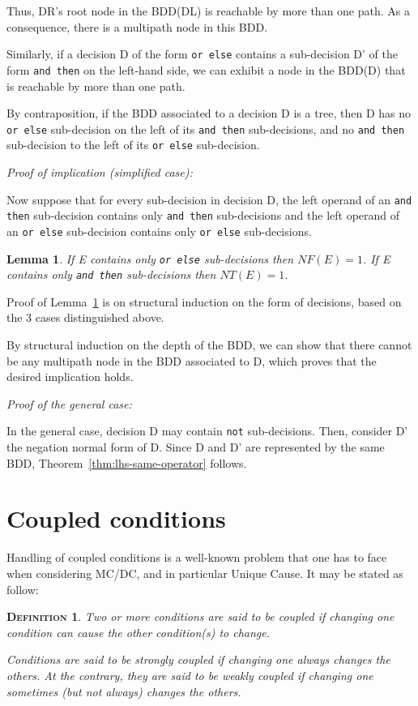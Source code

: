\documentclass[a4paper,12pt,twoside]{article}
\newcommand{\andthen}{\texttt{and then}}
\newcommand{\orelse}{\texttt{or else}}
\newcommand{\adanot}{\texttt{not}}
\newtheorem{definition}{\textsc{Definition}}
\newtheorem{lemma}{Lemma}[subsection]
\begin{document}
Thus, DR's root node in the BDD(DL) is reachable by more than one
path. As a consequence, there is a multipath node in this BDD.

Similarly, if a decision D of the form \orelse{} contains a
sub-decision D' of the form \andthen{} on the left-hand side, we can
exhibit a node in the BDD(D) that is reachable by more
than one path.

By contraposition, if the BDD associated to a decision D is a tree,
then D has no \orelse{} sub-decision on the left of its
\andthen{} sub-decisions, and no \andthen{} sub-decision to the left of
its \orelse{} sub-decision.

\emph{Proof of implication (simplified case):}

Now suppose that for every sub-decision in decision D, the left
operand of an \andthen{} sub-decision contains only \andthen{}
sub-decisions and the left operand of an \orelse{} sub-decision
contains only \orelse{} sub-decisions.

\begin{lemma}
\label{lemma:NF-NT-only-one-oper}
If E contains only \orelse{} sub-decisions then $NF(E) = 1$.
If E contains only \andthen{} sub-decisions then $NT(E) = 1$.
\end{lemma}

Proof of Lemma~\ref{lemma:NF-NT-only-one-oper} is on structural induction on
the form of decisions, based on the 3 cases distinguished above.

By structural induction on the depth of the BDD, we can show that there cannot
be any multipath node in the BDD associated to D, which proves that the desired
implication holds.

\emph{Proof of the general case:}

In the general case, decision D may contain \adanot{} sub-decisions. Then,
consider D' the negation normal form of D. Since D and D' are represented
by the same BDD, Theorem~\ref{thm:lhs-same-operator} follows.


\section{Coupled conditions}

Handling of coupled conditions is a well-known problem that one has
to face when considering MC/DC, and in particular Unique Cause. It may
be stated as follow:

\begin{definition}
  \label{def:coupled-conditions}
  Two or more conditions are said to be coupled if changing one condition
  can cause the other condition(s) to change.

  Conditions are said to be strongly coupled if changing one always
  changes the others. At the contrary, they are said to be weakly
  coupled if changing one sometimes (but not always) changes the others.
\end{definition}
\end{document}
